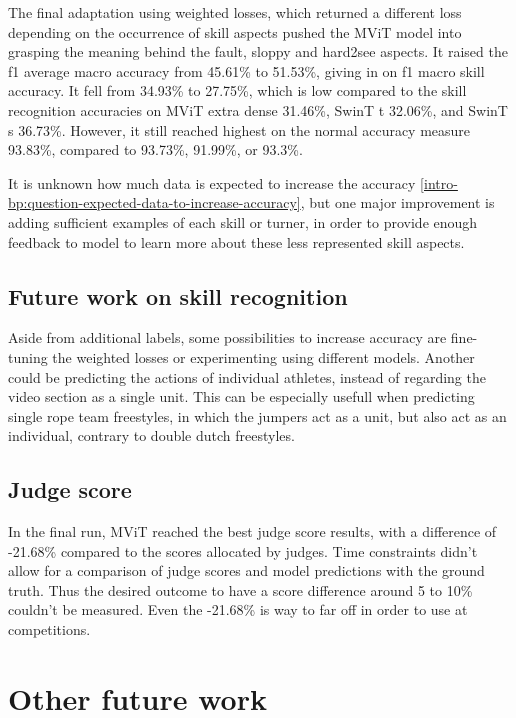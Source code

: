The final adaptation using weighted losses, which returned a different loss depending on the occurrence of skill aspects pushed the MViT model into grasping the meaning behind the fault, sloppy and hard2see aspects. It raised the f1 average macro accuracy from 45.61\% to 51.53\%, giving in on f1 macro skill accuracy. It fell from 34.93\% to 27.75\%, which is low compared to the skill recognition accuracies on MViT extra dense 31.46\%, SwinT t 32.06\%, and SwinT s 36.73\%. However, it still reached highest on the normal accuracy measure 93.83\%, compared to 93.73\%, 91.99\%, or 93.3\%.

It is unknown how much data is expected to increase the accuracy \ref{intro-bp:question-expected-data-to-increase-accuracy}, but one major improvement is adding sufficient examples of each skill or turner, in order to provide enough feedback to model to learn more about these less represented skill aspects.

\subsection{Future work on skill recognition}

Aside from additional labels, some possibilities to increase accuracy are fine-tuning the weighted losses or experimenting using different models. Another could be predicting the actions of individual athletes, instead of regarding the video section as a single unit. This can be especially usefull when predicting single rope team freestyles, in which the jumpers act as a unit, but also act as an individual, contrary to double dutch freestyles.

\subsection{Judge score}

In the final run, MViT reached the best judge score results, with a difference of -21.68\% compared to the scores allocated by judges.
Time constraints didn't allow for a comparison of judge scores and model predictions with the ground truth. Thus the desired outcome to have a score difference around 5 to 10\% couldn't be measured. Even the -21.68\% is way to far off in order to use at competitions.

\section{Other future work}
\label{discussion:future-work}

